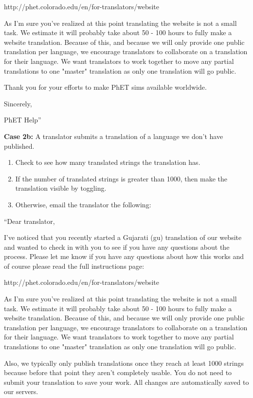 \documentclass[titlepage]{article}
\begin{document}
http://phet.colorado.edu/en/for-translators/website

As I'm sure you've realized at this point translating the website is not a small task.  We estimate it will probably take about 50 - 100 hours to fully make a website translation.  Because of this, and because we will only provide one public translation per language, we encourage translators to collaborate on a translation for their language.  We want translators to work together to move any partial translations to one "master" translation as only one translation will go public.

Thank you for your efforts to make PhET sims available worldwide.

Sincerely,

PhET Help''

\textbf{Case 2b:}
A translator submits a translation of a language we don't have published.
		
		\begin{enumerate}
			\item Check to see how many translated strings the translation has.
			\item If the number of translated strings is greater than 1000, then make the translation visible by toggling.
			\item Otherwise, email the translator the following:
		\end{enumerate}

``Dear translator,

I've noticed that you recently started a Gujarati (gu) translation of our website and wanted to check in with you to see if you have any questions about the process.  Please let me know if you have any questions about how this works and of course please read the full instructions page:

http://phet.colorado.edu/en/for-translators/website

As I'm sure you've realized at this point translating the website is not a small task.  We estimate it will probably take about 50 - 100 hours to fully make a website translation.  Because of this, and because we will only provide one public translation per language, we encourage translators to collaborate on a translation for their language.  We want translators to work together to move any partial translations to one "master" translation as only one translation will go public.

Also, we typically only publish translations once they reach at least 1000 strings because before that point they aren't completely usable. You do not need to submit your translation to save your work. All changes are automatically saved to our servers.
\end{document}
